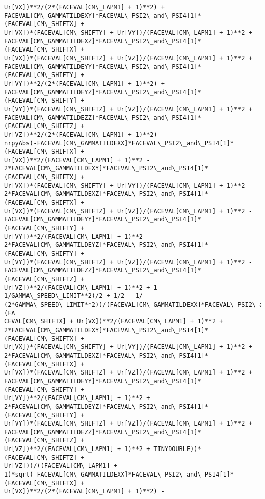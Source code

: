 \documentclass[landscape,letterpaper,10pt,english]{article}
\begin{document}
\begin{Verbatim}[commandchars=\\\{\}]
Ur[VX])**2/(2*(FACEVAL[CM\_LAPM1] + 1)**2) +
FACEVAL[CM\_GAMMATILDEXY]*FACEVAL\_PSI2\_and\_PSI4[1]*(FACEVAL[CM\_SHIFTX] +
Ur[VX])*(FACEVAL[CM\_SHIFTY] + Ur[VY])/(FACEVAL[CM\_LAPM1] + 1)**2 +
FACEVAL[CM\_GAMMATILDEXZ]*FACEVAL\_PSI2\_and\_PSI4[1]*(FACEVAL[CM\_SHIFTX] +
Ur[VX])*(FACEVAL[CM\_SHIFTZ] + Ur[VZ])/(FACEVAL[CM\_LAPM1] + 1)**2 +
FACEVAL[CM\_GAMMATILDEYY]*FACEVAL\_PSI2\_and\_PSI4[1]*(FACEVAL[CM\_SHIFTY] +
Ur[VY])**2/(2*(FACEVAL[CM\_LAPM1] + 1)**2) +
FACEVAL[CM\_GAMMATILDEYZ]*FACEVAL\_PSI2\_and\_PSI4[1]*(FACEVAL[CM\_SHIFTY] +
Ur[VY])*(FACEVAL[CM\_SHIFTZ] + Ur[VZ])/(FACEVAL[CM\_LAPM1] + 1)**2 +
FACEVAL[CM\_GAMMATILDEZZ]*FACEVAL\_PSI2\_and\_PSI4[1]*(FACEVAL[CM\_SHIFTZ] +
Ur[VZ])**2/(2*(FACEVAL[CM\_LAPM1] + 1)**2) -
nrpyAbs(-FACEVAL[CM\_GAMMATILDEXX]*FACEVAL\_PSI2\_and\_PSI4[1]*(FACEVAL[CM\_SHIFTX] +
Ur[VX])**2/(FACEVAL[CM\_LAPM1] + 1)**2 -
2*FACEVAL[CM\_GAMMATILDEXY]*FACEVAL\_PSI2\_and\_PSI4[1]*(FACEVAL[CM\_SHIFTX] +
Ur[VX])*(FACEVAL[CM\_SHIFTY] + Ur[VY])/(FACEVAL[CM\_LAPM1] + 1)**2 -
2*FACEVAL[CM\_GAMMATILDEXZ]*FACEVAL\_PSI2\_and\_PSI4[1]*(FACEVAL[CM\_SHIFTX] +
Ur[VX])*(FACEVAL[CM\_SHIFTZ] + Ur[VZ])/(FACEVAL[CM\_LAPM1] + 1)**2 -
FACEVAL[CM\_GAMMATILDEYY]*FACEVAL\_PSI2\_and\_PSI4[1]*(FACEVAL[CM\_SHIFTY] +
Ur[VY])**2/(FACEVAL[CM\_LAPM1] + 1)**2 -
2*FACEVAL[CM\_GAMMATILDEYZ]*FACEVAL\_PSI2\_and\_PSI4[1]*(FACEVAL[CM\_SHIFTY] +
Ur[VY])*(FACEVAL[CM\_SHIFTZ] + Ur[VZ])/(FACEVAL[CM\_LAPM1] + 1)**2 -
FACEVAL[CM\_GAMMATILDEZZ]*FACEVAL\_PSI2\_and\_PSI4[1]*(FACEVAL[CM\_SHIFTZ] +
Ur[VZ])**2/(FACEVAL[CM\_LAPM1] + 1)**2 + 1 - 1/GAMMA\_SPEED\_LIMIT**2)/2 + 1/2 - 1/
(2*GAMMA\_SPEED\_LIMIT**2))/(FACEVAL[CM\_GAMMATILDEXX]*FACEVAL\_PSI2\_and\_PSI4[1]*(FA
CEVAL[CM\_SHIFTX] + Ur[VX])**2/(FACEVAL[CM\_LAPM1] + 1)**2 +
2*FACEVAL[CM\_GAMMATILDEXY]*FACEVAL\_PSI2\_and\_PSI4[1]*(FACEVAL[CM\_SHIFTX] +
Ur[VX])*(FACEVAL[CM\_SHIFTY] + Ur[VY])/(FACEVAL[CM\_LAPM1] + 1)**2 +
2*FACEVAL[CM\_GAMMATILDEXZ]*FACEVAL\_PSI2\_and\_PSI4[1]*(FACEVAL[CM\_SHIFTX] +
Ur[VX])*(FACEVAL[CM\_SHIFTZ] + Ur[VZ])/(FACEVAL[CM\_LAPM1] + 1)**2 +
FACEVAL[CM\_GAMMATILDEYY]*FACEVAL\_PSI2\_and\_PSI4[1]*(FACEVAL[CM\_SHIFTY] +
Ur[VY])**2/(FACEVAL[CM\_LAPM1] + 1)**2 +
2*FACEVAL[CM\_GAMMATILDEYZ]*FACEVAL\_PSI2\_and\_PSI4[1]*(FACEVAL[CM\_SHIFTY] +
Ur[VY])*(FACEVAL[CM\_SHIFTZ] + Ur[VZ])/(FACEVAL[CM\_LAPM1] + 1)**2 +
FACEVAL[CM\_GAMMATILDEZZ]*FACEVAL\_PSI2\_and\_PSI4[1]*(FACEVAL[CM\_SHIFTZ] +
Ur[VZ])**2/(FACEVAL[CM\_LAPM1] + 1)**2 + TINYDOUBLE))*(FACEVAL[CM\_SHIFTZ] +
Ur[VZ]))/((FACEVAL[CM\_LAPM1] +
1)*sqrt(-FACEVAL[CM\_GAMMATILDEXX]*FACEVAL\_PSI2\_and\_PSI4[1]*(FACEVAL[CM\_SHIFTX] +
Ur[VX])**2/(2*(FACEVAL[CM\_LAPM1] + 1)**2) -

\end{Verbatim}
\end{document}
